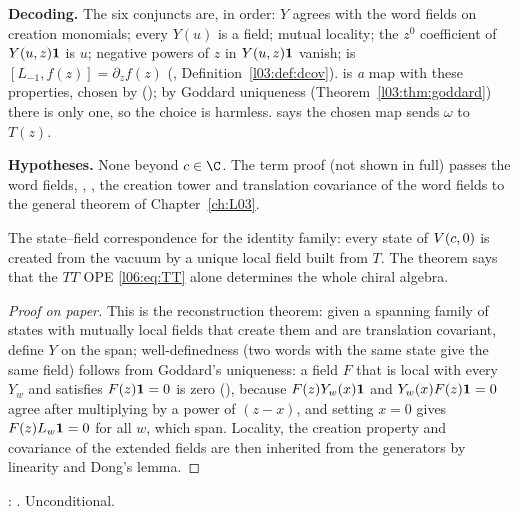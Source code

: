 \begin{dictionary}
\textbf{Decoding.} The six conjuncts are, in order: $Y$ agrees with the word fields on creation
monomials; every $Y(u)$ is a field; mutual locality; the $z^0$ coefficient of $Y(u,z)\mathbf{1}$ is $u$;
negative powers of $z$ in $Y(u,z)\mathbf{1}$ vanish;  is
$[L_{-1},f(z)] = \partial_zf(z)$ (, Definition~\ref{l03:def:dcov}).
 is \emph{a} map with these properties, chosen by  ();
by Goddard uniqueness (Theorem~\ref{l03:thm:goddard}) there is only one, so the choice is harmless.
 says the chosen map sends $\omega$ to $T(z)$.

\textbf{Hypotheses.} None beyond $c\in\C$. The term proof (not shown in full) passes the word fields,
, , the creation tower and translation covariance of the
word fields to the general theorem \allowbreak{} of Chapter~\ref{ch:L03}.
\end{dictionary}

\begin{physics}
The state--field correspondence for the identity family: every state of $V(c,0)$ is created from the
vacuum by a unique local field built from $T$. The theorem says that the $TT$ OPE \eqref{l06:eq:TT}
alone determines the whole chiral algebra.
\end{physics}

\begin{proof}[Proof on paper]
This is the reconstruction theorem: given a spanning family of states with mutually local fields
that create them and are translation covariant, define $Y$ on the span; well-definedness (two words with
the same state give the same field) follows from Goddard's uniqueness: a field $F$ that is local with
every $Y_w$ and satisfies $F(z)\mathbf{1} = 0$ is zero (\allowbreak{}\allowbreak{}\allowbreak{}\allowbreak{}), because
$F(z)Y_w(x)\mathbf{1}$ and $Y_w(x)F(z)\mathbf{1} = 0$ agree after multiplying by a power of $(z-x)$, and setting
$x = 0$ gives $F(z)L_w\mathbf{1} = 0$ for all $w$, which span. Locality, the creation property and
covariance of the extended fields are then inherited from the generators by linearity and Dong's lemma.
\end{proof}

\begin{status}
\allowbreak{}\allowbreak{}\allowbreak{}: \lean{[propext, Classical.}\allowbreak{}\allowbreak\lean{sound]}. Unconditional.
\end{status}

